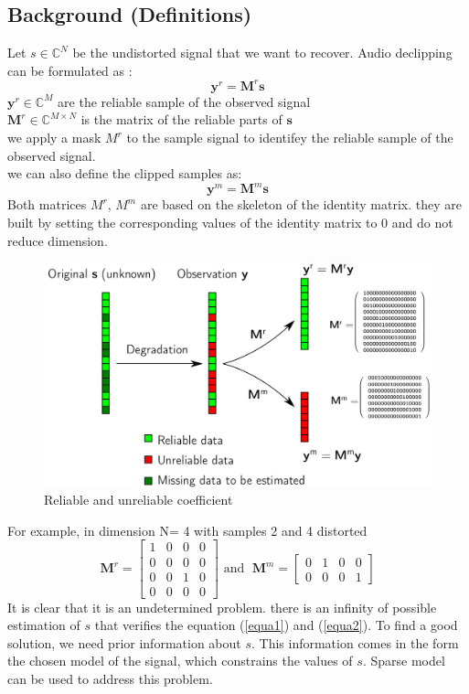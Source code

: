 \documentclass{article}
\numberwithin{dummy}{section}
\begin{document}
\subsection{Background (Definitions)}
Let $s \in \mathbb{C}^N$ be the undistorted signal that we want to recover. Audio declipping can be formulated as :
\begin{equation}
\mathbf{y}^{r}=\mathbf{M}^{r} \mathbf{s}    
\label{equa1}
\end{equation}
$\mathbf{y}^{r} \in \mathbb{C}^{M}$ are the reliable sample of the observed signal\\
$\mathbf{M}^{r} \in \mathbb{C}^{M \times N}$ is the matrix of the reliable parts of $\mathbf{s}$\\
we apply a mask $M^r$ to the  sample signal to identifey the  reliable sample of the observed signal.\\
we can also define the clipped samples as:
\begin{equation}
\mathbf{y}^{m}=\mathbf{M}^{m} \mathbf{s}
\label{equa2}
\end{equation}
Both matrices $M^r$, $M^m$ are based on the skeleton of the identity matrix. they are  built  by  setting  the  corresponding  values  of  the identity matrix to 0 and do not reduce dimension.
\begin{figure}[ht!]
    \centering
    \includegraphics[scale=0.3]{figures/cd&&&&&&&&&&.png}
    \caption{Reliable and unreliable coefficient \cite{Matthieu} }
    \label{fig:my_label}
\end{figure}

For example, in dimension N= 4 with samples 2 and 4 distorted
$$
\boldsymbol{M}^{r}=\left[\begin{array}{cccc}
1 & 0 & 0 & 0 \\
0 & 0 & 0 & 0 \\
0 & 0 & 1 & 0 \\
0 & 0 & 0 & 0
\end{array}\right] \text { and } \; \boldsymbol{M}^{m}=\left[\begin{array}{cccc}
0 & 1 & 0 & 0 \\
0 & 0 & 0 & 1
\end{array}\right]
$$
It is clear that it is an undetermined problem. there is an infinity of possible estimation of $s$ that verifies the equation (\ref{equa1}) and (\ref{equa2}). To find a good solution, we need prior information about $s$. This information comes in the form the chosen model of the signal, which constrains the values of $s$. Sparse model can be used to address this problem.\\
\end{document}
